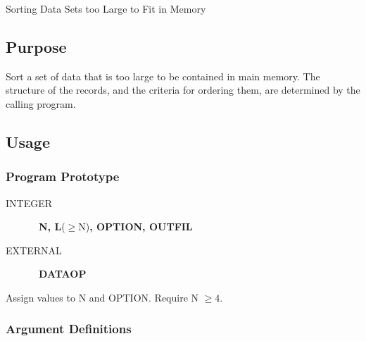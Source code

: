\documentclass[twoside]{MATH77}
\begin{document}
  Sorting Data Sets too Large to Fit in Memory


\subsection{Purpose}

Sort a set of data that is too large to be contained in main memory. The
structure of the records, and the criteria for ordering them, are determined
by the calling program.

\subsection{Usage}

\subsubsection{Program Prototype}

\begin{description}

\item[INTEGER] \ {\bf N, L}($\geq $N){\bf , OPTION, OUTFIL}

\item[EXTERNAL] \ {\bf DATAOP}

\end{description}

Assign values to N and OPTION. Require N $\geq 4.$
\begin{center}
\end{center}
\subsubsection{Argument Definitions}
\end{document}
